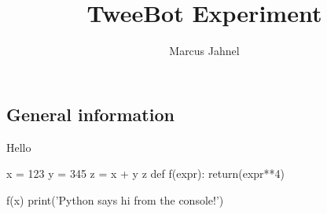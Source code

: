 \documentclass[a4paper, landscape, 10pt, onesided, twocolumn]{scrreprt}
\title{TweeBot Experiment}
\author{Marcus Jahnel}
\begin{document}
\subsection*{General information}

Hello
\begin{pyconsole}[][frame=single]
x = 123
y = 345
z = x + y
z
def f(expr):
    return(expr**4)

f(x)
print('Python says hi from the console!')
\end{pyconsole}
\end{document}
